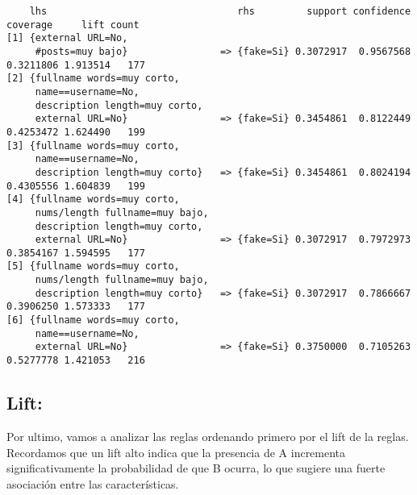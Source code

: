\documentclass[
  letterpaper,
  DIV=11,
  numbers=noendperiod]{scrreprt}
\begin{document}
\begin{verbatim}
    lhs                                 rhs         support confidence  coverage     lift count
[1] {external URL=No,                                                                          
     #posts=muy bajo}                => {fake=Si} 0.3072917  0.9567568 0.3211806 1.913514   177
[2] {fullname words=muy corto,                                                                 
     name==username=No,                                                                        
     description length=muy corto,                                                             
     external URL=No}                => {fake=Si} 0.3454861  0.8122449 0.4253472 1.624490   199
[3] {fullname words=muy corto,                                                                 
     name==username=No,                                                                        
     description length=muy corto}   => {fake=Si} 0.3454861  0.8024194 0.4305556 1.604839   199
[4] {fullname words=muy corto,                                                                 
     nums/length fullname=muy bajo,                                                            
     description length=muy corto,                                                             
     external URL=No}                => {fake=Si} 0.3072917  0.7972973 0.3854167 1.594595   177
[5] {fullname words=muy corto,                                                                 
     nums/length fullname=muy bajo,                                                            
     description length=muy corto}   => {fake=Si} 0.3072917  0.7866667 0.3906250 1.573333   177
[6] {fullname words=muy corto,                                                                 
     name==username=No,                                                                        
     external URL=No}                => {fake=Si} 0.3750000  0.7105263 0.5277778 1.421053   216
\end{verbatim}

\subsection{Lift:}\label{lift}

Por ultimo, vamos a analizar las reglas ordenando primero por el lift de
la reglas. Recordamos que un lift alto indica que la presencia de A
incrementa significativamente la probabilidad de que B ocurra, lo que
sugiere una fuerte asociación entre las características.
\end{document}
